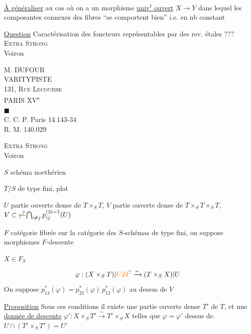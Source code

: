 \uline{À } \uline{généraliser} au cas où on a un morphisme  \uline{univ\textsuperscript{t} ouvert} $X\to Y$ dans lequel les composantes connexes  des fibres ``se comportent bien'' i.e. en nb  constant 

\uline{Question} Caractérisation des foncteurs représentables par des rev. étales ???
\textsc{Extra Strong}\\
 Voiron

M. DUFOUR\\
VARITYPISTE\\
131, \textsc{Rue Lecourbe}\\
PARIS XV\textsuperscript{e}\\
$\blacksquare$\\
C. C. P. Paris 14.143-34\\
R. M. 140.029

\textsc{Extra Strong}\\
 Voiron

$S$ schéma noethérien

$T/S$ de type fini,  plat

$U$ partie ouverte dense de $T\times_S T$, $V$ partie ouverte dense de $T\times_S T\times_S T$, $V\subset\deleted{\unsure{p}}\bigcap_{i\ne j}p_{ij}^{(3)-1}(U)$

$F$ catégorie fibrée sur la catégorie des $S$-schémas de type fini, on suppose     morphismes   $F$-descente 

$X\in F_S$

\[
\varphi:(X\times_S T)|\unsure{U|\mathcal{U}}\xrightarrow{\sim}(T\times_S X)|U
\]
On suppose $p_{13}^{*}(\varphi)={p}_{23}^{*}(\varphi)\,p_{12}^{*}(\varphi)$ au dessus de $V$

\uline{Proposition} Sous ces conditions il existe une partie ouverte dense $T'$  de $T$, et une \uline{donnée de descente} $\varphi':X\times_S T'\xrightarrow{\sim}T'\times_S X$ telles que $\varphi=\varphi'$  dessus de. $U\cap(T'\times_S T')=U'$

